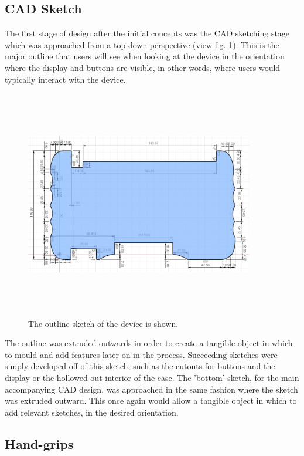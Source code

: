 \subsection{CAD Sketch}

The first stage of design after the initial concepts was the CAD sketching stage which was approached from a top-down perspective (view fig. \ref{fig:Sketch}).
This is the major outline that users will see when looking at the device in the orientation where the display and buttons are visible, in other words, where users would typically interact with the device.

\begin{figure} [h]
    \centering
    \includegraphics[width=10cm,height=10cm,keepaspectratio]{Figures/blue_sketch.png}
    \caption{The outline sketch of the device is shown.}
    \label{fig:Sketch}
\end{figure}

The outline was extruded outwards in order to create a tangible object in which to mould and add features later on in the process.
Succeeding sketches were simply developed off of this sketch, such as the cutouts for buttons and the display or the hollowed-out interior of the case.
The 'bottom' sketch, for the main accompanying CAD design, was approached in the same fashion where the sketch was extruded outward.
This once again would allow a tangible object in which to add relevant sketches, in the desired orientation.

\subsection{Hand-grips}

